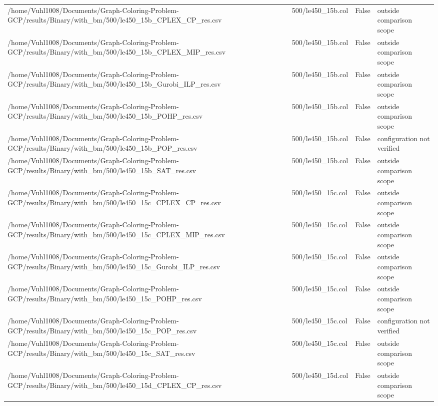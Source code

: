 \begin{table}[htbp]
\begin{tabular}{llll}
/home/Vuhl1008/Documents/Graph-Coloring-Problem-GCP/results/Binary/with\_bm/500/le450\_15b\_CPLEX\_CP\_res.csv & 500/le450\_15b.col & False & outside comparison scope \\
/home/Vuhl1008/Documents/Graph-Coloring-Problem-GCP/results/Binary/with\_bm/500/le450\_15b\_CPLEX\_MIP\_res.csv & 500/le450\_15b.col & False & outside comparison scope \\
/home/Vuhl1008/Documents/Graph-Coloring-Problem-GCP/results/Binary/with\_bm/500/le450\_15b\_Gurobi\_ILP\_res.csv & 500/le450\_15b.col & False & outside comparison scope \\
/home/Vuhl1008/Documents/Graph-Coloring-Problem-GCP/results/Binary/with\_bm/500/le450\_15b\_POHP\_res.csv & 500/le450\_15b.col & False & outside comparison scope \\
/home/Vuhl1008/Documents/Graph-Coloring-Problem-GCP/results/Binary/with\_bm/500/le450\_15b\_POP\_res.csv & 500/le450\_15b.col & False & configuration not verified \\
/home/Vuhl1008/Documents/Graph-Coloring-Problem-GCP/results/Binary/with\_bm/500/le450\_15b\_SAT\_res.csv & 500/le450\_15b.col & False & outside comparison scope \\
/home/Vuhl1008/Documents/Graph-Coloring-Problem-GCP/results/Binary/with\_bm/500/le450\_15c\_CPLEX\_CP\_res.csv & 500/le450\_15c.col & False & outside comparison scope \\
/home/Vuhl1008/Documents/Graph-Coloring-Problem-GCP/results/Binary/with\_bm/500/le450\_15c\_CPLEX\_MIP\_res.csv & 500/le450\_15c.col & False & outside comparison scope \\
/home/Vuhl1008/Documents/Graph-Coloring-Problem-GCP/results/Binary/with\_bm/500/le450\_15c\_Gurobi\_ILP\_res.csv & 500/le450\_15c.col & False & outside comparison scope \\
/home/Vuhl1008/Documents/Graph-Coloring-Problem-GCP/results/Binary/with\_bm/500/le450\_15c\_POHP\_res.csv & 500/le450\_15c.col & False & outside comparison scope \\
/home/Vuhl1008/Documents/Graph-Coloring-Problem-GCP/results/Binary/with\_bm/500/le450\_15c\_POP\_res.csv & 500/le450\_15c.col & False & configuration not verified \\
/home/Vuhl1008/Documents/Graph-Coloring-Problem-GCP/results/Binary/with\_bm/500/le450\_15c\_SAT\_res.csv & 500/le450\_15c.col & False & outside comparison scope \\
/home/Vuhl1008/Documents/Graph-Coloring-Problem-GCP/results/Binary/with\_bm/500/le450\_15d\_CPLEX\_CP\_res.csv & 500/le450\_15d.col & False & outside comparison scope \\

\end{tabular}
\end{table}
